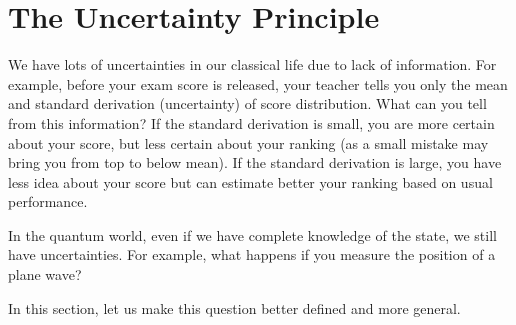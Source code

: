 \section{The Uncertainty Principle} \label{sec:uncertainty}

We have lots of uncertainties in our classical life due to lack of information. For example, before your exam score is released, your teacher tells you only the mean and standard derivation (uncertainty) of score distribution. What can you tell from this information? If the standard derivation is small, you are more certain about your score, but less certain about your ranking (as a small mistake may bring you from top to below mean). If the standard derivation is large, you have less idea about your score but can estimate better your ranking based on usual performance.

In the quantum world, even if we have complete knowledge of the state, we still have uncertainties. For example, what happens if you measure the position of a plane wave?

In this section, let us make this question better defined and more general.



